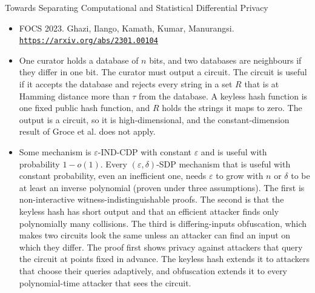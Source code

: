 \documentclass[aspectratio=169,10pt]{beamer}
\newcommand{\venue}[3]{\item #1. #2.\\ \href{#3}{\nolinkurl{#3}}}
\begin{document}
\begin{frame}{Towards Separating Computational and Statistical Differential Privacy}
  \begin{itemize}
    \venue{FOCS 2023}{Ghazi, Ilango, Kamath, Kumar, Manurangsi}{https://arxiv.org/abs/2301.00104}
    \item One curator holds a database of $n$ bits, and two databases are neighbours if they differ in one bit. The curator must output a circuit. The circuit is useful if it accepts the database and rejects every string in a set $R$ that is at Hamming distance more than $\tau$ from the database. A keyless hash function is one fixed public hash function, and $R$ holds the strings it maps to zero. The output is a circuit, so it is high-dimensional, and the constant-dimension result of Groce et al. does not apply.
    \item Some mechanism is $\varepsilon$-IND-CDP with constant $\varepsilon$ and is useful with probability $1-o(1)$. Every $(\varepsilon,\delta)$-SDP mechanism that is useful with constant probability, even an inefficient one, needs $\varepsilon$ to grow with $n$ or $\delta$ to be at least an inverse polynomial (proven under three assumptions). The first is non-interactive witness-indistinguishable proofs. The second is that the keyless hash has short output and that an efficient attacker finds only polynomially many collisions. The third is differing-inputs obfuscation, which makes two circuits look the same unless an attacker can find an input on which they differ. The proof first shows privacy against attackers that query the circuit at points fixed in advance. The keyless hash extends it to attackers that choose their queries adaptively, and obfuscation extends it to every polynomial-time attacker that sees the circuit.
  \end{itemize}
\end{frame}
\end{document}
